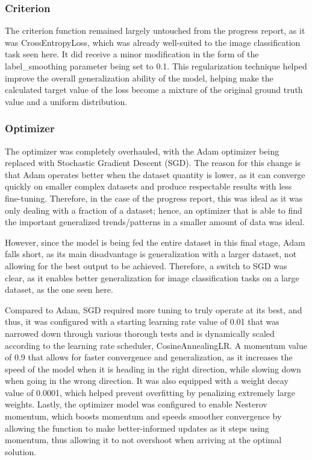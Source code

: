 \documentclass[11pt]{article}
\begin{document}
\subsubsection{Criterion}

The criterion function remained largely untouched from the progress report, as it was CrossEntropyLoss, which was already well-suited to the image classification task seen here. It did receive a minor modification in the form of the label\_smoothing parameter being set to 0.1. This regularization technique helped improve the overall generalization ability of the model, helping make the calculated target value of the loss become a mixture of the original ground truth value and a uniform distribution.

\subsubsection{Optimizer}

The optimizer was completely overhauled, with the Adam optimizer being replaced with Stochastic Gradient Descent (SGD). The reason for this change is that Adam operates better when the dataset quantity is lower, as it can converge quickly on smaller complex datasets and produce respectable results with less fine-tuning. Therefore, in the case of the progress report, this was ideal as it was only dealing with a fraction of a dataset; hence, an optimizer that is able to find the important generalized trends/patterns in a smaller amount of data was ideal.

However, since the model is being fed the entire dataset in this final stage, Adam falls short, as its main disadvantage is generalization with a larger dataset, not allowing for the best output to be achieved. Therefore, a switch to SGD was clear, as it enables better generalization for image classification tasks on a large dataset, as the one seen here.

Compared to Adam, SGD required more tuning to truly operate at its best, and thus, it was configured with a starting learning rate value of 0.01 that was narrowed down through various thorough tests and is dynamically scaled according to the learning rate scheduler, CosineAnnealingLR. A momentum value of 0.9 that allows for faster convergence and generalization, as it increases the speed of the model when it is heading in the right direction, while slowing down when going in the wrong direction. It was also equipped with a weight decay value of 0.0001, which helped prevent overfitting by penalizing extremely large weights. Lastly, the optimizer model was configured to enable Nesterov momentum, which boosts momentum and speeds smoother convergence by allowing the function to make better-informed updates as it steps using momentum, thus allowing it to not overshoot when arriving at the optimal solution.
\end{document}
